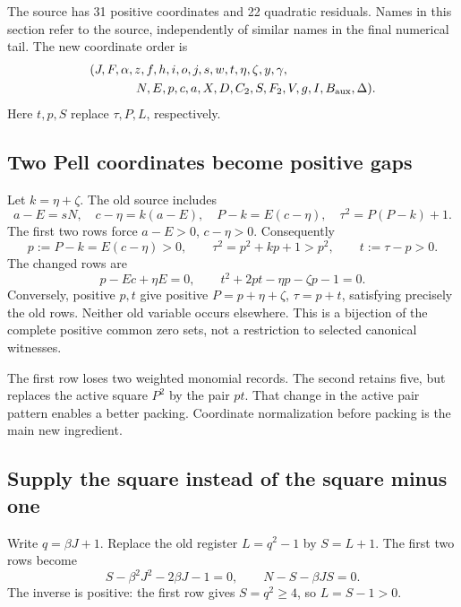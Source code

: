 \documentclass[11pt,a4paper]{article}
\theoremstyle{remark}
\begin{document}
The source has 31 positive coordinates and 22 quadratic residuals.
Names in this section refer to the source, independently of similar
names in the final numerical tail. The new coordinate order is
\begin{equation}
\begin{split}
 &(J,F,\alpha,z,f,h,i,o,j,s,w,t,\eta,\zeta,y,\gamma,\\
 &\hspace{13mm}N,E,p,c,a,X,D,C_2,S,F_2,V,g,I,B_{\mathrm{aux}},\Delta).
\end{split}
\label{eq:source-order}
\end{equation}
Here \(t,p,S\) replace \(\tau,P,L\), respectively.

\subsection{Two Pell coordinates become positive gaps}

Let \(k=\eta+\zeta\). The old source includes
\[
 a-E=sN,\quad c-\eta=k(a-E),\quad
 P-k=E(c-\eta),\quad \tau^2=P(P-k)+1.
\]
The first two rows force \(a-E>0\), \(c-\eta>0\). Consequently
\[
 p:=P-k=E(c-\eta)>0,\qquad
 \tau^2=p^2+kp+1>p^2,\qquad t:=\tau-p>0.
\]
The changed rows are
\begin{equation}
\boxed{\quad p-Ec+\eta E=0,\qquad
 t^2+2pt-\eta p-\zeta p-1=0.\quad}
\label{eq:gap}
\end{equation}
Conversely, positive \(p,t\) give positive
\(P=p+\eta+\zeta\), \(\tau=p+t\), satisfying precisely the old rows.
Neither old variable occurs elsewhere. This is a bijection of the
complete positive common zero sets, not a restriction to selected
canonical witnesses.

The first row loses two weighted monomial records. The second retains
five, but replaces the active square \(P^2\) by the pair \(pt\).
That change in the active pair pattern enables a better packing.
Coordinate normalization before packing is the main new ingredient.

\subsection{Supply the square instead of the square minus one}

Write \(q=\beta J+1\). Replace the old register \(L=q^2-1\)
by \(S=L+1\). The first two rows become
\begin{equation}
 S-\beta^2J^2-2\beta J-1=0,\qquad
 N-S-\beta JS=0.
\label{eq:square-shift}
\end{equation}
The inverse is positive: the first row gives \(S=q^2\ge4\),
so \(L=S-1>0\).
\end{document}
